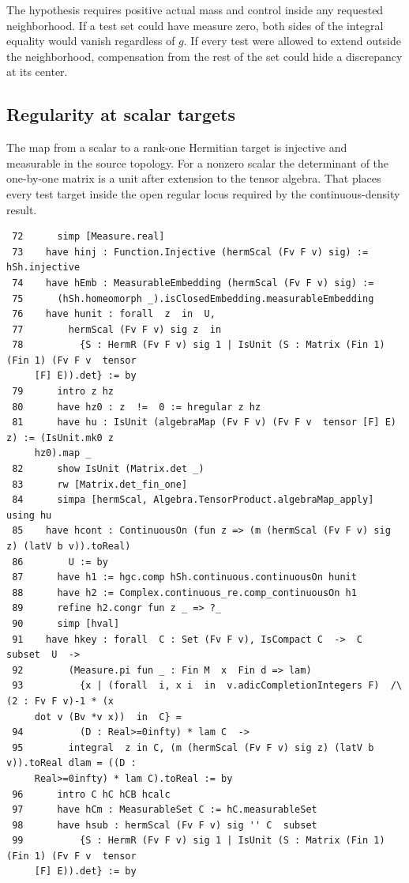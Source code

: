 \documentclass[12pt,letterpaper]{article}
\begin{document}
The hypothesis requires positive actual mass and control inside any requested neighborhood. If a test set could have measure zero, both sides of the integral equality would vanish regardless of $g$. If every test were allowed to extend outside the neighborhood, compensation from the rest of the set could hide a discrepancy at its center.
\clearpage{}\subsection*{Regularity at scalar targets}
The map from a scalar to a rank-one Hermitian target is injective and measurable in the source topology. For a nonzero scalar the determinant of the one-by-one matrix is a unit after extension to the tensor algebra. That places every test target inside the open regular locus required by the continuous-density result.
\par
{\fontsize{8.8}{10.5}\selectfont\begin{verbatim}
 72      simp [Measure.real]
 73    have hinj : Function.Injective (hermScal (Fv F v) sig) := hSh.injective
 74    have hEmb : MeasurableEmbedding (hermScal (Fv F v) sig) :=
 75      (hSh.homeomorph _).isClosedEmbedding.measurableEmbedding
 76    have hunit : forall  z  in  U,
 77        hermScal (Fv F v) sig z  in
 78          {S : HermR (Fv F v) sig 1 | IsUnit (S : Matrix (Fin 1) (Fin 1) (Fv F v  tensor
     [F] E)).det} := by
 79      intro z hz
 80      have hz0 : z  !=  0 := hregular z hz
 81      have hu : IsUnit (algebraMap (Fv F v) (Fv F v  tensor [F] E) z) := (IsUnit.mk0 z
     hz0).map _
 82      show IsUnit (Matrix.det _)
 83      rw [Matrix.det_fin_one]
 84      simpa [hermScal, Algebra.TensorProduct.algebraMap_apply] using hu
 85    have hcont : ContinuousOn (fun z => (m (hermScal (Fv F v) sig z) (latV b v)).toReal)
 86        U := by
 87      have h1 := hgc.comp hSh.continuous.continuousOn hunit
 88      have h2 := Complex.continuous_re.comp_continuousOn h1
 89      refine h2.congr fun z _ => ?_
 90      simp [hval]
 91    have hkey : forall  C : Set (Fv F v), IsCompact C  ->  C  subset  U  ->
 92        (Measure.pi fun _ : Fin M  x  Fin d => lam)
 93          {x | (forall  i, x i  in  v.adicCompletionIntegers F)  /\  (2 : Fv F v)-1 * (x
     dot v (Bv *v x))  in  C} =
 94          (D : Real>=0infty) * lam C  ->
 95        integral  z in C, (m (hermScal (Fv F v) sig z) (latV b v)).toReal dlam = ((D :
     Real>=0infty) * lam C).toReal := by
 96      intro C hC hCB hcalc
 97      have hCm : MeasurableSet C := hC.measurableSet
 98      have hsub : hermScal (Fv F v) sig '' C  subset
 99          {S : HermR (Fv F v) sig 1 | IsUnit (S : Matrix (Fin 1) (Fin 1) (Fv F v  tensor
     [F] E)).det} := by
\end{verbatim}}
\end{document}
